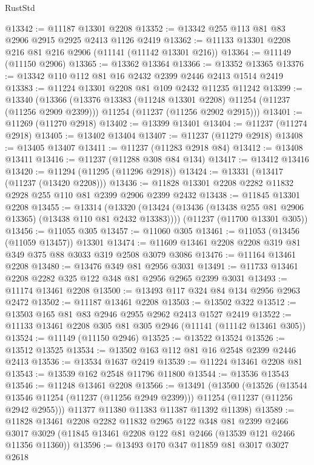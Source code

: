 \begin{lexlean}{RustStd}
\begin{coremodule}
@13342 := @11187 @13301 @2208
@13352 := @13342 @255 @113 @81 @83 @2906 @2915 @2925 @2413 @1126 @2419
@13362 := @11133 @13301 @2208 @216 @81 @216 @2906 (@11141 (@11142 @13301 @216))
@13364 := @11149 (@11150 @2906)
@13365 := @13362 @13364
@13366 := @13352 @13365
@13376 := @13342 @110 @112 @81 @16 @2432 @2399 @2446 @2413 @1514 @2419
@13383 := @11224 @13301 @2208 @81 @109 @2432 @11235 @11242
@13399 := @13340
    (@13366
      (@13376 @13383 (@11248 @13301 @2208) @11254 (@11237 (@11256 @2909 @2399)))
      @11254
      (@11237 (@11256 @2902 @2915)))
@13401 := @11269 (@11270 @2918)
@13402 := @13399 @13401
@13404 := @11237 (@11274 @2918)
@13405 := @13402 @13404
@13407 := @11237 (@11279 @2918)
@13408 := @13405 @13407
@13411 := @11237 (@11283 @2918 @84)
@13412 := @13408 @13411
@13416 := @11237 (@11288 @308 @84 @134)
@13417 := @13412 @13416
@13420 := @11294 (@11295 (@11296 @2918))
@13424 := @13331 (@13417 (@11237 (@13420 @2208)))
@13436 := @11828 @13301 @2208 @2282 @11832 @2928 @255 @110 @81 @2399 @2906 @2399 @2432
@13438 := @11845 @13301 @2208
@13455 := @13314
    (@13320 (@13424 (@13436 (@13438 @255 @81 @2906 @13365) (@13438 @110 @81 @2432 @13383))))
    (@11237 (@11700 @13301 @305))
@13456 := @11055 @305
@13457 := @11060 @305
@13461 := @11053 (@13456 (@11059 @13457)) @13301
@13474 := @11609 @13461 @2208 @2208 @319 @81 @349 @375 @88 @3033 @319 @2508 @3079 @3086
@13476 := @11164 @13461 @2208
@13480 := @13476 @349 @81 @2956 @3031
@13491 := @11733 @13461 @2208 @2282 @325 @122 @348 @81 @2956 @2965 @2399 @3031
@13493 := @11174 @13461 @2208
@13500 := @13493 @117 @324 @84 @134 @2956 @2963 @2472
@13502 := @11187 @13461 @2208
@13503 := @13502 @322
@13512 := @13503 @165 @81 @83 @2946 @2955 @2962 @2413 @1527 @2419
@13522 := @11133 @13461 @2208 @305 @81 @305 @2946 (@11141 (@11142 @13461 @305))
@13524 := @11149 (@11150 @2946)
@13525 := @13522 @13524
@13526 := @13512 @13525
@13534 := @13502 @163 @112 @81 @16 @2548 @2399 @2446 @2413
@13536 := @13534 @1637 @2419
@13539 := @11224 @13461 @2208 @81
@13543 := @13539 @162 @2548 @11796 @11800
@13544 := @13536 @13543
@13546 := @11248 @13461 @2208
@13566 := @13491
    (@13500
      (@13526
        (@13544 @13546 @11254 (@11237 (@11256 @2949 @2399)))
        @11254
        (@11237 (@11256 @2942 @2955)))
      @11377
      @11380
      @11383
      @11387
      @11392
      @11398)
@13589 := @11828
    @13461
    @2208
    @2282
    @11832
    @2965
    @122
    @348
    @81
    @2399
    @2466
    @3017
    @3029
    (@11845 @13461 @2208 @122 @81 @2466 (@13539 @121 @2466 @11356 @11360))
@13596 := @13493 @170 @347 @11859 @81 @3017 @3027 @2618

\end{coremodule}
\end{lexlean}
